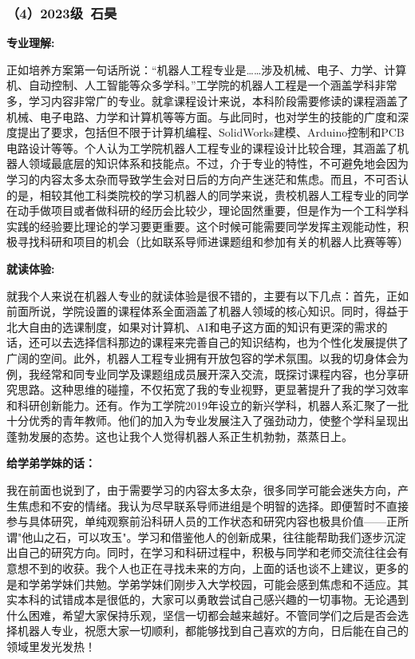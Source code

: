 \documentclass[11pt,oneside]{book}
\begin{document}
\subsubsection{（4）2023级\ 石昊}

\textbf{专业理解:}

正如培养方案第一句话所说：“机器人工程专业是……涉及机械、电子、力学、计算机、自动控制、人工智能等众多学科。”工学院的机器人工程是一个涵盖学科非常多，学习内容非常广的专业。就拿课程设计来说，本科阶段需要修读的课程涵盖了机械、电子电路、力学和计算机等等方面。与此同时，也对学生的技能的广度和深度提出了要求，包括但不限于计算机编程、SolidWorks建模、Arduino控制和PCB电路设计等等。个人认为工学院机器人工程专业的课程设计比较合理，其涵盖了机器人领域最底层的知识体系和技能点。不过，介于专业的特性，不可避免地会因为学习的内容太多太杂而导致学生会对日后的方向产生迷茫和焦虑。而且，不可否认的是，相较其他工科类院校的学习机器人的同学来说，贵校机器人工程专业的同学在动手做项目或者做科研的经历会比较少，理论固然重要，但是作为一个工科学科实践的经验要比理论的学习要更重要。这个时候可能需要同学发挥主观能动性，积极寻找科研和项目的机会（比如联系导师进课题组和参加有关的机器人比赛等等）

\vspace{10pt}

\textbf{就读体验:}

就我个人来说在机器人专业的就读体验是很不错的，主要有以下几点：首先，正如前面所说，学院设置的课程体系全面涵盖了机器人领域的核心知识。同时，得益于北大自由的选课制度，如果对计算机、AI和电子这方面的知识有更深的需求的话，还可以去选择信科那边的课程来完善自己的知识结构，也为个性化发展提供了广阔的空间。此外，机器人工程专业拥有开放包容的学术氛围。以我的切身体会为例，我经常和同专业同学及课题组成员展开深入交流，既探讨课程内容，也分享研究思路。这种思维的碰撞，不仅拓宽了我的专业视野，更显著提升了我的学习效率和科研创新能力。还有。作为工学院2019年设立的新兴学科，机器人系汇聚了一批十分优秀的青年教师。他们的加入为专业发展注入了强劲动力，使整个学科呈现出蓬勃发展的态势。这也让我个人觉得机器人系正生机勃勃，蒸蒸日上。

\vspace{10pt}

\textbf{给学弟学妹的话：}

我在前面也说到了，由于需要学习的内容太多太杂，很多同学可能会迷失方向，产生焦虑和不安的情绪。我认为尽早联系导师进组是个明智的选择。即便暂时不直接参与具体研究，单纯观察前沿科研人员的工作状态和研究内容也极具价值——正所谓"他山之石，可以攻玉"。学习和借鉴他人的创新成果，往往能帮助我们逐步沉淀出自己的研究方向。同时，在学习和科研过程中，积极与同学和老师交流往往会有意想不到的收获。我个人也正在寻找未来的方向，上面的话也谈不上建议，更多的是和学弟学妹们共勉。学弟学妹们刚步入大学校园，可能会感到焦虑和不适应。其实本科的试错成本是很低的，大家可以勇敢尝试自己感兴趣的一切事物。无论遇到什么困难，希望大家保持乐观，坚信一切都会越来越好。不管同学们之后是否会选择机器人专业，祝愿大家一切顺利，都能够找到自己喜欢的方向，日后能在自己的领域里发光发热！
\end{document}
